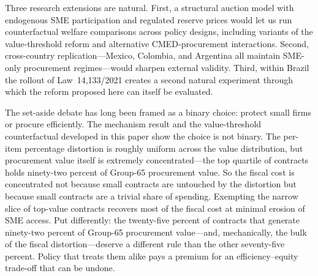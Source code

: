 Three research extensions are natural. First, a structural auction model with endogenous SME participation and regulated reserve prices would let us run counterfactual welfare comparisons across policy designs, including variants of the value-threshold reform and alternative CMED-procurement interactions. Second, cross-country replication---Mexico, Colombia, and Argentina all maintain SME-only procurement regimes---would sharpen external validity. Third, within Brazil the rollout of Law~14{,}133/2021 creates a second natural experiment through which the reform proposed here can itself be evaluated.

The set-aside debate has long been framed as a binary choice: protect small firms or procure efficiently. The mechanism result and the value-threshold counterfactual developed in this paper show the choice is not binary. The per-item percentage distortion is roughly uniform across the value distribution, but procurement value itself is extremely concentrated---the top quartile of contracts holds ninety-two percent of Group-65 procurement value. So the fiscal cost is concentrated not because small contracts are untouched by the distortion but because small contracts are a trivial share of spending. Exempting the narrow slice of top-value contracts recovers most of the fiscal cost at minimal erosion of SME access. Put differently: the twenty-five percent of contracts that generate ninety-two percent of Group-65 procurement value---and, mechanically, the bulk of the fiscal distortion---deserve a different rule than the other seventy-five percent. Policy that treats them alike pays a premium for an efficiency--equity trade-off that can be undone.
